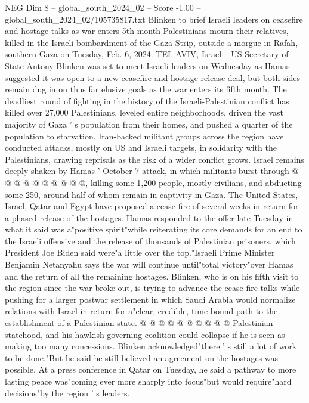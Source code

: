 \begin{textsample}{NEG Dim 8 – global\_south\_2024\_02 – Score -1.00 – global\_south\_2024\_02/105735817.txt}  \label{ex:f8_neg_060}
Blinken to brief Israeli leaders on ceasefire and hostage talks as war enters 5th month Palestinians mourn their relatives, killed in the Israeli bombardment of the Gaza Strip, outside a morgue in Rafah, southern Gaza on Tuesday, Feb. 6, 2024.
TEL AVIV, Israel -- US Secretary of State Antony Blinken was set to meet Israeli leaders on Wednesday as Hamas suggested it was open to a new ceasefire and hostage release deal, but both sides remain dug in on thus far elusive goals as the war enters its fifth month.
The deadliest round of fighting in the history of the Israeli-Palestinian conflict has killed over 27,000 Palestinians, leveled entire neighborhoods, driven the vast majority of Gaza ' s population from their homes, and pushed a quarter of the population to starvation.
Iran-backed militant groups across the region have conducted attacks, mostly on US and Israeli targets, in solidarity with the Palestinians, drawing reprisals as the risk of a wider conflict grows.
Israel remains deeply shaken by Hamas ' October 7 attack, in which militants burst through @ @ @ @ @ @ @ @ @ @, killing some 1,200 people, mostly civilians, and abducting some 250, around half of whom remain in captivity in Gaza.
The United States, Israel, Qatar and Egypt have proposed a cease-fire of several weeks in return for a phased release of the hostages.
Hamas responded to the offer late Tuesday in what it said was a"positive spirit"while reiterating its core demands for an end to the Israeli offensive and the release of thousands of Palestinian prisoners, which President Joe Biden said were"a little over the top."Israeli Prime Minister Benjamin Netanyahu says the war will continue until"total victory"over Hamas and the return of all the remaining hostages.
Blinken, who is on his fifth visit to the region since the war broke out, is trying to advance the cease-fire talks while pushing for a larger postwar settlement in which Saudi Arabia would normalize relations with Israel in return for a"clear, credible, time-bound path to the establishment of a Palestinian state. @ @ @ @ @ @ @ @ @ @ Palestinian statehood, and his hawkish governing coalition could collapse if he is seen as making too many concessions.
Blinken acknowledged"there ' s still a lot of work to be done."But he said he still believed an agreement on the hostages was possible.
At a press conference in Qatar on Tuesday, he said a pathway to more lasting peace was"coming ever more sharply into focus"but would require"hard decisions"by the region ' s leaders.

\end{textsample}
